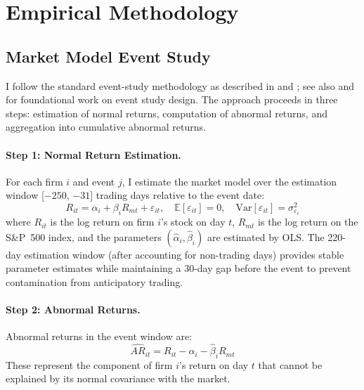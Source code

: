 \documentclass[12pt]{article}
\newcommand{\E}{\mathbb{E}}\newcommand{\Var}{\text{Var}}\newcommand{\Cov}{\text{Cov}}
\begin{document}



\section{Empirical Methodology}\label{sec:method}

\subsection{Market Model Event Study}

I follow the standard event-study methodology as described in \citet{mackinlay1997event} and \citet{campbell1997econometrics}; see also \citet{fama1969adjustment} and \citet{brown1985using} for foundational work on event study design. The approach proceeds in three steps: estimation of normal returns, computation of abnormal returns, and aggregation into cumulative abnormal returns.

\paragraph{Step 1: Normal Return Estimation.} For each firm $i$ and event $j$, I estimate the market model over the estimation window [$-250$, $-31$] trading days relative to the event date:
\begin{equation}\label{eq:market_model}
R_{it} = \alpha_i + \beta_i R_{mt} + \varepsilon_{it}, \quad \E[\varepsilon_{it}] = 0, \quad \Var[\varepsilon_{it}] = \sigma^2_{\varepsilon_i}
\end{equation}
where $R_{it}$ is the log return on firm $i$'s stock on day $t$, $R_{mt}$ is the log return on the S\&P~500 index, and the parameters $(\hat{\alpha}_i, \hat{\beta}_i)$ are estimated by OLS. The 220-day estimation window (after accounting for non-trading days) provides stable parameter estimates while maintaining a 30-day gap before the event to prevent contamination from anticipatory trading.

\paragraph{Step 2: Abnormal Returns.} Abnormal returns in the event window are:
\begin{equation}\label{eq:ar}
\widehat{AR}_{it} = R_{it} - \hat{\alpha}_i - \hat{\beta}_i R_{mt}
\end{equation}
These represent the component of firm $i$'s return on day $t$ that cannot be explained by its normal covariance with the market.
\end{document}
